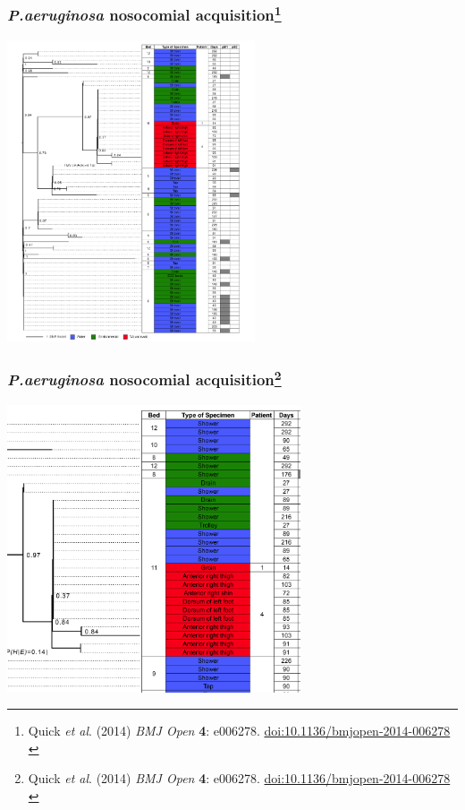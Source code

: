 \begin{frame}
  \frametitle{\textit{P.aeruginosa} nosocomial acquisition\footnote{\tiny{Quick \textit{et al}. (2014) \textit{BMJ Open} \textbf{4}: e006278. \href{http://dx.doi.org/10.1136/bmjopen-2014-006278}{doi:10.1136/bmjopen-2014-006278}}\\}}
  \begin{center}
    \includegraphics[width=0.55\textwidth]{images/quick_fig3}
  \end{center}
\end{frame}

\begin{frame}
  \frametitle{\textit{P.aeruginosa} nosocomial acquisition\footnote{\tiny{Quick \textit{et al}. (2014) \textit{BMJ Open} \textbf{4}: e006278. \href{http://dx.doi.org/10.1136/bmjopen-2014-006278}{doi:10.1136/bmjopen-2014-006278}}\\}}
  \begin{center}
    \includegraphics[width=0.65\textwidth]{images/quick_fig3_zoom}
  \end{center}
\end{frame}

